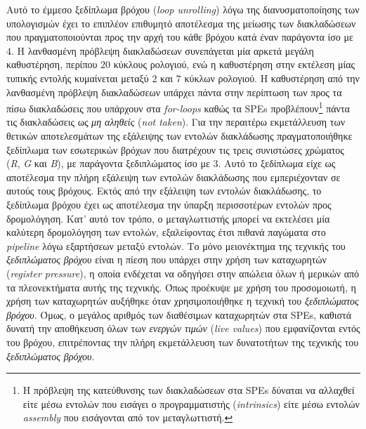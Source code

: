 Αυτό το έμμεσο ξεδίπλωμα βρόχου (\textsl{loop unrolling}) λόγω της διανυσματοποίησης των υπολογισμών έχει το επιπλέον επιθυμητό αποτέλεσμα της μείωσης των διακλαδώσεων που πραγματοποιούνται προς την αρχή του κάθε βρόχου κατά έναν παράγοντα ίσο με \(4\). Η λανθασμένη πρόβλεψη διακλαδώσεων συνεπάγεται μία αρκετά μεγάλη καθυστέρηση, περίπου \(20\) κύκλους ρολογιού, ενώ η καθυστέρηση στην εκτέλεση μίας τυπικής εντολής κυμαίνεται μεταξύ \(2\) και \(7\) κύκλων ρολογιού. Η καθυστέρηση από την λανθασμένη πρόβλεψη διακλαδώσεων υπάρχει πάντα στην περίπτωση των προς τα πίσω διακλαδώσεις που υπάρχουν στα \textsl{for-loops} καθώς τα \acp{SPE} προβλέπουν\footnote{\small Η πρόβλεψη της κατεύθυνσης των διακλαδώσεων στα \acp{SPE} δύναται να αλλαχθεί είτε μέσω εντολών που εισάγει ο προγραμματιστής (\textsl{intrinsics}) είτε μέσω εντολών \textsl{assembly} που εισάγονται από τον μεταγλωττιστή.} πάντα τις διακλαδώσεις ως \textsl{μη αληθείς} (\textsl{not taken}).\newline \indent 
Για την περαιτέρω εκμετάλλευση των θετικών αποτελεσμάτων της εξάλειψης των εντολών διακλάδωσης πραγματοποιήθηκε ξεδίπλωμα των εσωτερικών βρόχων που διατρέχουν τις τρεις συνιστώσες χρώματος (\textsl{R}, \textsl{G} και \textsl{B}), με παράγοντα ξεδιπλώματος ίσο με \(3\). Αυτό το ξεδίπλωμα είχε ως αποτέλεσμα την πλήρη εξάλειψη των εντολών διακλάδωσης που εμπεριέχονταν σε αυτούς τους βρόχους.\newline \indent 
Εκτός από την εξάλειψη των εντολών διακλάδωσης, το ξεδίπλωμα βρόχου έχει ως αποτέλεσμα την ύπαρξη περισσοτέρων εντολών προς δρομολόγηση. Κατ' αυτό τον τρόπο, ο μεταγλωττιστής μπορεί να εκτελέσει μία καλύτερη δρομολόγηση των εντολών, εξαλείφοντας έτσι πιθανά παγώματα στο \textsl{pipeline} λόγω εξαρτήσεων μεταξύ εντολών. Το μόνο μειονέκτημα της τεχνικής του \textsl{ξεδιπλώματος βρόχου} είναι η πίεση που υπάρχει στην χρήση των καταχωρητών (\textsl{register pressure}), η οποία ενδέχεται να οδηγήσει στην απώλεια όλων ή μερικών από τα πλεονεκτήματα αυτής της τεχνικής. Όπως προέκυψε με χρήση του προσομοιωτή, η χρήση των καταχωρητών αυξήθηκε όταν χρησιμοποιήθηκε η τεχνική του \textsl{ξεδιπλώματος βρόχου}. Όμως, ο μεγάλος αριθμός των διαθέσιμων καταχωρητών στα \acp{SPE}, καθιστά δυνατή την αποθήκευση όλων των \textsl{ενεργών τιμών} (\textsl{live values}) που εμφανίζονται εντός του βρόχου, επιτρέποντας την πλήρη εκμετάλλευση των δυνατοτήτων της τεχνικής του \textsl{ξεδιπλώματος βρόχου}.\newline \indent
